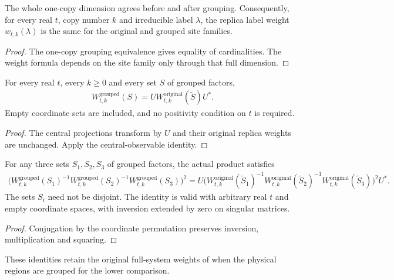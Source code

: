 \begin{theorem}
  \label{thm:regional_replica_dimension_weights}
  \leanok
  The whole one-copy dimension agrees before and after grouping.
  Consequently, for every real $t$, copy number $k$ and irreducible
  label $\lambda$, the replica label weight $w_{t,k}(\lambda)$ is
  the same for the original and grouped site families.
\end{theorem}
\begin{proof}\leanok
  The one-copy grouping equivalence gives equality of cardinalities.
  The weight formula depends on the site family only through that
  full dimension.
\end{proof}

\begin{theorem}
  \label{thm:regional_replica_metric_coordinates}
  \leanok
  For every real $t$, every $k\geq0$ and every set $S$ of grouped
  factors,
  \begin{align}
    W^{\mathrm{grouped}}_{t,k}(S)
       =U W^{\mathrm{original}}_{t,k}(\widetilde S)U^*.
  \end{align}
  Empty coordinate sets are included, and no positivity condition on
  $t$ is required.
\end{theorem}
\begin{proof}\leanok
  The central projections transform by $U$ and their original replica
  weights are unchanged. Apply the central-observable identity.
\end{proof}

\begin{theorem}
  \label{thm:regional_squared_inverse_metric_coordinates}
  \leanok
  For any three sets $S_1,S_2,S_3$ of grouped factors, the actual product
  satisfies
  \begin{align}
    \bigl(W^{\mathrm{grouped}}_{t,k}(S_1)^{-1}
      W^{\mathrm{grouped}}_{t,k}(S_2)^{-1}
      W^{\mathrm{grouped}}_{t,k}(S_3)\bigr)^2
    =U\bigl(W^{\mathrm{original}}_{t,k}(\widetilde S_1)^{-1}
      W^{\mathrm{original}}_{t,k}(\widetilde S_2)^{-1}
      W^{\mathrm{original}}_{t,k}(\widetilde S_3)\bigr)^2U^*.
  \end{align}
  The sets $S_i$ need not be disjoint. The identity is valid with
  arbitrary real $t$ and empty coordinate spaces, with inversion extended
  by zero on singular matrices.
\end{theorem}
\begin{proof}\leanok
  Conjugation by the coordinate permutation preserves inversion,
  multiplication and squaring.
\end{proof}

These identities retain the original full-system weights of
\cite[Sections~6 and~8]{OpenAI2026AreaLaw} when the physical regions
are grouped for the lower comparison.
